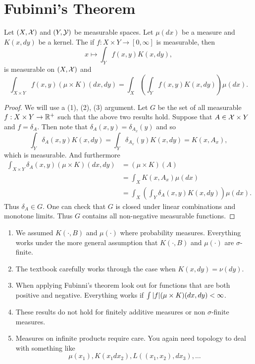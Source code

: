 \section{Fubinni's Theorem}
\begin{thrm}
    Let $(X,{\mathcal{X}})$ and $(Y,\mathcal{Y})$ be measurable spaces. Let $\mu(dx)$ be a measure and $K(x,dy)$ be a kernel. The if $f:X\times Y \to [0,\infty]$ is measurable, then 
    \[x \mapsto \int_Y f(x,y)K(x,dy),\]
    is measurable on $(X,{\mathcal{X}})$ and 
    \[\int_{X\times Y} f(x,y)(\mu \times K)(dx,dy) = \int_X\left(\int_Y f(x,y)K(x,dy)\right)\mu(dx). \]
\end{thrm}
\begin{proof}
    We will use a (1), (2), (3) argument. Let $G$ be the set of all measurable $f:X \times Y \to {\mathbb R}^+$ such that the above two results hold. Suppose that $A \in {\mathcal{X}}\times Y$ and $f=\delta_A$. Then note that $\delta_A(x,y) = \delta_{A_x}(y)$ and so
    \[\int_Y \delta_A(x,y)K(x,dy) = \int_Y \delta_{A_x}(y)K(x,dy) = K(x,A_x), \]
    which is measurable. And furthermore 
    \begin{align*}
        \int_{X\times Y} \delta_{A}(x,y)(\mu \times K)(dx,dy)&=(\mu\times K)(A)\\
        & = \int_X K(x,A_x)\mu(dx)\\
        &=\int_X\left(\int_Y \delta_A(x,y)K(x,dy)\right)\mu(dx).
    \end{align*}
    Thus $\delta_A \in G$. One can check that $G$ is closed under linear combinations and monotone limits. Thus $G$ contains all non-negative measurable functions. 
\end{proof}
\begin{remark}
    \begin{enumerate}
        \item We assumed $K(\cdot,B)$ and $\mu(\cdot)$ where probability measures. Everything works under the more general assumption that $K(\cdot,B)$ and $\mu(\cdot)$ are $\sigma$-finite.
        \item The textbook carefully works through the case when $K(x,dy) = \nu(dy)$.
        \item When applying Fubinni's theorem look out for functions that are both positive and negative. Everything works if $\int {\left\lvert f\right\rvert}(\mu\times K)(dx,dy) < \infty$.
        \item These results do not hold for finitely additive measures or non $\sigma$-finite measures.
        \item Measures on infinite products require care. You again need topology to deal with something like
         \[\mu(x_1), K(x_1dx_2), L((x_1,x_2), dx_3), \ldots \]
    \end{enumerate}
\end{remark}
